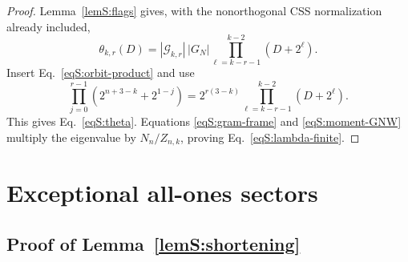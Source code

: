 \documentclass[journal,twocolumn]{IEEEtran}
\theoremstyle{definition}
\theoremstyle{plain}
\newcommand{\cG}{\mathcal G}
\begin{document}
\begin{proof}
Lemma~\ref{lemS:flags} gives, with the nonorthogonal CSS normalization
already included,
\begin{equation}
 \theta_{k,r}(D)=|\cG_{k,r}|\,|G_N|
 \prod_{\ell=k-r-1}^{k-2}(D+2^\ell).
 \label{eqS:theta-before}
\end{equation}
Insert Eq.~\eqref{eqS:orbit-product} and use
\begin{equation}
 \prod_{j=0}^{r-1}(2^{n+3-k}+2^{1-j})
 =2^{r(3-k)}
 \prod_{\ell=k-r-1}^{k-2}(D+2^\ell).
 \label{eqS:product-conversion}
\end{equation}
This gives Eq.~\eqref{eqS:theta}.  Equations
\eqref{eqS:gram-frame} and \eqref{eqS:moment-GNW} multiply the eigenvalue by
$N_n/Z_{n,k}$, proving Eq.~\eqref{eqS:lambda-finite}.
\end{proof}

\section{Exceptional all-ones sectors}
\label{app:exceptional}

\subsection{Proof of Lemma~\ref{lemS:shortening}}
\label{app:proof-shortening}
\end{document}
